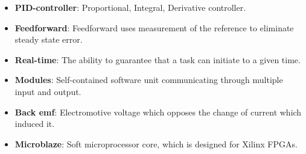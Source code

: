 \documentclass[../../main.tex]{subfiles}
\begin{document}
\begin{itemize}
    
    
    \item \textbf{PID-controller}: Proportional, Integral, Derivative controller.
    \item \textbf{Feedforward}: Feedforward uses measurement of the reference to eliminate steady state error.
    \item \textbf{Real-time}: The ability to guarantee that a task can initiate to a given time.
    \item \textbf{Modules}: Self-contained software unit communicating through multiple input and output.
    \item \textbf{Back emf}: Electromotive voltage which opposes the change of current which induced it. 
    \item \textbf{Microblaze}: Soft microprocessor core, which is designed for Xilinx FPGAs.
\end{itemize}
\end{document}

